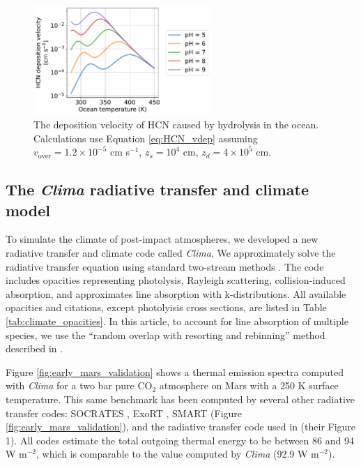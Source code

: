\begin{figure}
  \centering
  \includegraphics[width=0.6\textwidth]{tex/5impacts/figures/supplement/vdep_HCN.pdf}
  \caption{The deposition velocity of HCN caused by hydrolysis in the ocean. Calculations use Equation \eqref{eq:HCN_vdep} assuming $v_\mathrm{over} = 1.2 \times 10^{-5}$ cm s$^{-1}$, $z_s = 10^{4}$ cm, $z_d = 4 \times 10^{5}$ cm.}
  \label{fig:vdep_hcn}
\end{figure}

\subsection{The \emph{Clima} radiative transfer and climate model} \label{sec:clima}

To simulate the climate of post-impact atmospheres, we developed a new radiative transfer and climate code called \emph{Clima}. We approximately solve the radiative transfer equation using standard two-stream methods \citep{Toon_1989}. The code includes opacities representing photolysis, Rayleigh scattering, collision-induced absorption, and approximates line absorption with k-distributions. All available opacities and citations, except photolyisis cross sections, are listed in Table \ref{tab:climate_opacities}. In this article, to account for line absorption of multiple species, we use the ``random overlap with resorting and rebinning'' method described in \citet{Amundsen_2017}. 

Figure \ref{fig:early_mars_validation} shows a thermal emission spectra computed with \emph{Clima} for a two bar pure CO$_2$ atmosphere on Mars with a 250 K surface temperature. This same benchmark has been computed by several other radiative transfer codes: SOCRATES \citep[Figure 2]{Wolf_2022}, ExoRT \citep[Figure 2]{Wolf_2022}, SMART (Figure \ref{fig:early_mars_validation}), and the radiative transfer code used in \citet{Kopparapu_2013} (their Figure 1). All codes estimate the total outgoing thermal energy to be between 86 and 94 W m$^{-2}$, which is comparable to the value computed by \emph{Clima} (92.9 W m$^{-2}$).

